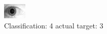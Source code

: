 \begin{figure}[h!]
\begin{center}
\includegraphics[width=0.60\columnwidth]{figures/ID1953_class_4_target_3.png}
\end{center}
\caption{ Classification: 4 actual target: 3}
\label{fig:ID1953_class_4_target_3}
\end{figure}
